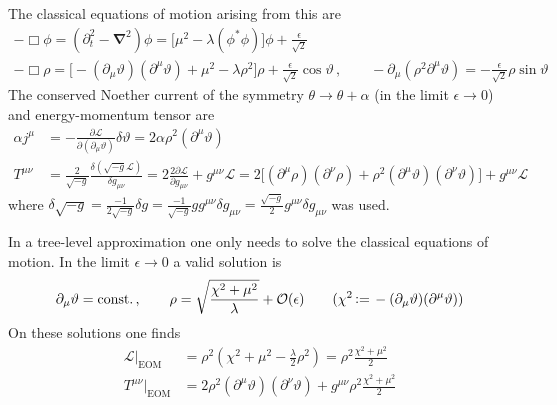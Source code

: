 The classical equations of motion arising from this are
\begin{subequations}
    \begin{gather}
        -\Box\phi=(\partial_t^2-\mathbf{\nabla}^2)\phi=\big[\mu^2-\lambda(\phi^*\phi)\big]\phi+\frac{\epsilon}{\sqrt{2}}\\
        -\Box\rho                                                =\big[-(\partial_\mu\vartheta)(\partial^\mu\vartheta)+\mu^2-\lambda\rho^2\big]\rho+\frac{\epsilon}{\sqrt{2}}\cos\vartheta\,,\qquad-\partial_\mu(\rho^2\partial^\mu\vartheta) =-\frac{\epsilon}{\sqrt{2}}\rho\sin\vartheta
    \end{gather}
\end{subequations}
The conserved Noether current of the symmetry $\theta\to\theta+\alpha$ (in the limit $\epsilon\to 0$) and energy-momentum tensor are
\begin{subequations}
    \begin{align}
        \alpha j^\mu & =-\frac{\partial\mathscr{L}}{\partial(\partial_\mu\vartheta)}\delta\vartheta=2\alpha\rho^2(\partial^\mu\vartheta)                                                                                                                                                             \\
        T^{\mu\nu}   & =\frac{2}{\sqrt{-g}}\frac{\delta(\sqrt{-g}\mathscr{L})}{\delta g_{\mu\nu}}=2\frac{2\partial\mathscr{L}}{\partial g_{\mu\nu}}+g^{\mu\nu}\mathscr{L}=2\big[(\partial^\mu\rho)(\partial^\nu\rho)+\rho^2(\partial^\mu\vartheta)(\partial^\nu\vartheta)\big]+g^{\mu\nu}\mathscr{L}
    \end{align}
\end{subequations}
where $\delta\sqrt{-g}=\frac{-1}{2\sqrt{-g}}\delta g=\frac{-1}{\sqrt{-g}}gg^{\mu\nu}\delta g_{\mu\nu}=\frac{\sqrt{-g}}{2}g^{\mu\nu}\delta g_{\mu\nu}$ was used.

In a tree-level approximation one only needs to solve the classical equations of motion. In the limit $\epsilon\to 0$ a valid solution is
\begin{equation}
    \partial_\mu\vartheta={\text{const.}}\,,\qquad\rho=\sqrt{\frac{\chi^2+\mu^2}{\lambda}}+\mathcal{O}(\epsilon)\qquad(\chi^2{\,\vcentcolon=\,}-(\partial_\mu\vartheta)(\partial^\mu\vartheta))
\end{equation}
On these solutions one finds
\begin{subequations}
    \begin{align}
        \mathscr{L}\big\vert_{\text{EOM}} & =\rho^2(\chi^2+\mu^2-\frac{\lambda}{2}\rho^2)=\rho^2\frac{\chi^2+\mu^2}{2}                    \\
        T^{\mu\nu}\big\vert_{\text{EOM}}  & =2\rho^2(\partial^\mu\vartheta)(\partial^\nu\vartheta)+g^{\mu\nu}\rho^2\frac{\chi^2+\mu^2}{2}
    \end{align}
\end{subequations}

